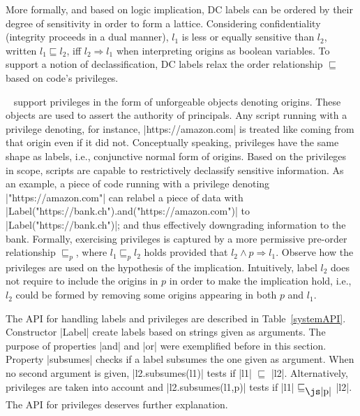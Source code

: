 More formally, and based on logic implication, DC labels can be ordered by their
degree of sensitivity in order to form a lattice. Considering confidentiality
(integrity proceeds in a dual manner), $l_1$ is less or equally sensitive than
$l_2$, written $l_1 \sqsubseteq l_2$, iff $l_2 \Rightarrow l_1$ when
interpreting origins as boolean variables. To support a notion of 
declassification, DC labels relax the order relationship $\sqsubseteq$ based
on code's privileges.  


\sys~ support privileges in the form of unforgeable objects denoting
origins. These objects are used to assert the authority of principals.  Any
script running with a privilege denoting, for instance, \js|https://amazon.com|
is treated like coming from that origin even if it did not.  Conceptually
speaking, privileges have the same shape as labels, i.e., conjunctive normal
form of origins.  Based on the privileges in scope, scripts are capable to
restrictively declassify sensitive information.  As an example, a piece of code
running with a privilege denoting \js|"https://amazon.com"| can relabel a piece
of data with \js|Label("https://bank.ch").and("https://amazon.com")| to
\js|Label("https://bank.ch")|; and thus effectively downgrading information to
the bank. Formally, exercising privileges is captured by a more permissive
pre-order relationship $\sqsubseteq_p$, where $l_1 \sqsubseteq_p l_2$ holds
provided that $l_2 \land p \Rightarrow l_1$. Observe how the privileges are used
on the hypothesis of the implication. Intuitively, label $l_2$ does not require to
include the origins in $p$ in order to make the implication hold, i.e., 
$l_2$ could be formed by removing some origins appearing in both $p$ and $l_1$.
 
The API for handling labels and privileges are described in
Table~\ref{systemAPI}. Constructor \js|Label| create labels based on strings
given as arguments. The purpose of properties \js|and| and \js|or| 
were exemplified before in this section.  Property \js|subsumes| checks if a
label subsumes the one given as argument. When no second argument is
given, \js|l2.subsumes(l1)| tests if \js|l1| $\sqsubseteq$
\js|l2|. Alternatively, privileges are taken into account and
\js|l2.subsumes(l1,p)| tests if \js|l1| $\sqsubseteq_{\mbox{\js|p|}}$ \js|l2|.
The API for privileges deserves further explanation.

